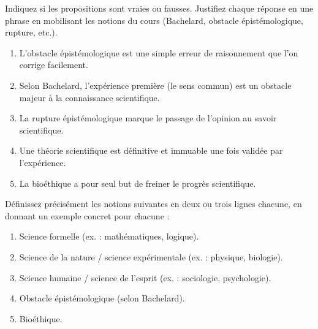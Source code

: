 \documentclass[11pt]{article}
\newcommand{\cle}[1]{{\popxbold\color{popdark}#1}}
\begin{document}
\begin{exercice}
Indiquez si les propositions sont vraies ou fausses. Justifiez chaque réponse en une phrase en mobilisant les notions du cours (Bachelard, obstacle épistémologique, rupture, etc.).
\begin{enumerate}
    \item L'obstacle épistémologique est une simple erreur de raisonnement que l'on corrige facilement.
    \item Selon Bachelard, l'expérience première (le sens commun) est un obstacle majeur à la connaissance scientifique.
    \item La rupture épistémologique marque le passage de l'opinion au savoir scientifique.
    \item Une théorie scientifique est définitive et immuable une fois validée par l'expérience.
    \item La bioéthique a pour seul but de freiner le progrès scientifique.
\end{enumerate}
\end{exercice}

\begin{exercice}
Définissez précisément les notions suivantes en deux ou trois lignes chacune, en donnant un exemple concret pour chacune :
\begin{enumerate}
    \item Science formelle (ex. : \cle{mathématiques}, \cle{logique}).
    \item Science de la nature / science expérimentale (ex. : \cle{physique}, \cle{biologie}).
    \item Science humaine / science de l'esprit (ex. : \cle{sociologie}, \cle{psychologie}).
    \item Obstacle épistémologique (selon Bachelard).
    \item Bioéthique.
\end{enumerate}
\end{exercice}
\end{document}

